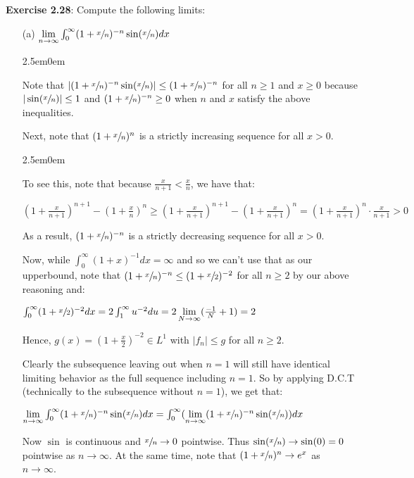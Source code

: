 \documentclass{book}
\newcommand{\exTwoP}{%
   \color{RedViolet}%
   \fontsize{13}{15}\selectfont%
}
\newcommand{\exPPP}{%
   \color{VioletRed}%
   \fontsize{12}{14}\selectfont%
}
\newenvironment{myIndent}{%
   \begin{adjustwidth}{2.5em}{0em}%
}{%
   \end{adjustwidth}%
}
\newcommand{\blab}[1]{\textbf{#1}}
\newcommand{\retTwo}{\hfill\bigbreak}
\begin{document}
\blab{Exercise 2.28}: Compute the following limits:
\begin{enumerate}
	\item[(a)] $\lim\limits_{n \rightarrow \infty} \int_0^\infty (1+\sfrac{x}{n})^{-n}\sin(\sfrac{x}{n})dx$
	\begin{myIndent}\exTwoP
		Note that $|(1 + \sfrac{x}{n})^{-n}\sin(\sfrac{x}{n})| \leq (1 + \sfrac{x}{n})^{-n}$ for all $n \geq 1$ and $x \geq 0$ because $|\sin(\sfrac{x}{n})| \leq 1$ and $(1 + \sfrac{x}{n})^{-n} \geq 0$ when $n$ and $x$ satisfy the above inequalities.\retTwo

		Next, note that $(1 + \sfrac{x}{n})^n$ is a strictly increasing sequence for all $x > 0$. 
		\begin{myIndent}\exPPP
			To see this, note that because $\frac{x}{n+1} < \frac{x}{n}$, we have that:
			
			{\centering\fontsize{11}{13}\selectfont $(1 + \frac{x}{n + 1})^{n + 1} - (1 + \frac{x}{n})^n \geq (1 + \frac{x}{n + 1})^{n + 1} - (1 + \frac{x}{n+1})^n = (1 + \frac{x}{n+1})^n\cdot \frac{x}{n+1} > 0$\retTwo\par}
		\end{myIndent}

		As a result, $(1 + \sfrac{x}{n})^{-n}$ is a strictly decreasing sequence for all $x > 0$.\retTwo

		Now, while $\int_{0}^\infty(1 + x)^{-1}dx = \infty$ and so we can't use that as our upperbound, note that $(1 + \sfrac{x}{n})^{-n} \leq (1 + \sfrac{x}{2})^{-2}$ for all $n \geq 2$ by our above reasoning and:

		{\centering $\int_0^\infty(1 + \sfrac{x}{2})^{-2}dx = 2\int_1^\infty u^{-2}du = 2\lim\limits_{N \rightarrow \infty}(\frac{-1}{N} + 1) = 2$ \retTwo\par}

		Hence, $g(x) = (1 + \frac{x}{2})^{-2} \in L^1$ with $|f_n| \leq g$ for all $n \geq 2$.\retTwo

		Clearly the subsequence leaving out when $n = 1$ will still have identical limiting behavior as the full sequence including $n = 1$. So by applying D.C.T (technically to the subsequence without $n = 1$), we get that:

		{\centering $\lim\limits_{n \rightarrow \infty} \int_0^\infty (1+\sfrac{x}{n})^{-n}\sin(\sfrac{x}{n})dx = \int_0^\infty(\lim\limits_{n \rightarrow \infty} (1+\sfrac{x}{n})^{-n}\sin(\sfrac{x}{n}))dx$ \retTwo\par}

		Now $\sin$ is continuous and $\sfrac{x}{n} \rightarrow 0$ pointwise. Thus $\sin(\sfrac{x}{n}) \rightarrow \sin(0) = 0$ pointwise as $n \rightarrow \infty$. At the same time, note that $(1 + \sfrac{x}{n})^{n} \rightarrow e^{x}$ as\\ $n \rightarrow \infty$.
		

\end{myIndent}
\end{enumerate}
\end{document}
